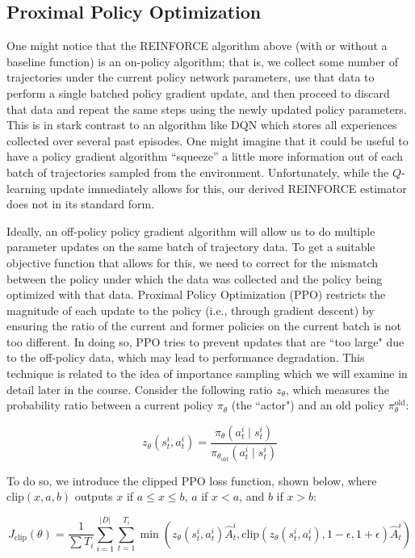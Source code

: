 \documentclass{article}
\begin{document}
\subsection{Proximal Policy Optimization}

One might notice that the REINFORCE algorithm above (with or without a baseline function) is an on-policy algorithm; that is, we collect some number of trajectories under the current policy network parameters, use that data to perform a single batched policy gradient update, and then proceed to discard that data and repeat the same steps using the newly updated policy parameters. This is in stark contrast to an algorithm like DQN which stores all experiences collected over several past episodes. One might imagine that it could be useful to have a policy gradient algorithm ``squeeze'' a little more information out of each batch of trajectories sampled from the environment. Unfortunately, while the $Q$-learning update immediately allows for this, our derived REINFORCE estimator does not in its standard form.

Ideally, an off-policy policy gradient algorithm will allow us to do multiple parameter updates on the same batch of trajectory data. To get a suitable objective function that allows for this, we need to correct for the mismatch between the policy under which the data was collected and the policy being optimized with that data. Proximal Policy Optimization (PPO) restricts the magnitude of each update to the policy (i.e., through gradient descent) by ensuring the ratio of the current and former policies on the current batch is not too different. In doing so, PPO tries to prevent updates that are ``too large" due to the off-policy data, which may lead to performance degradation. This technique is related to the idea of importance sampling which we will examine in detail later in the course. Consider the following ratio $z_\theta$, which measures the probability ratio between a current policy $\pi_\theta$ (the ``actor") and an old policy $\pi_\theta^\mathrm{old}$:

$$
z_\theta(s^i_t, a^i_t) = \frac{\pi_\theta(a^i_t \mid s^i_t)}{\pi_{\theta_\mathrm{old}}(a^i_t \mid s^i_t)}
$$

To do so, we introduce the clipped PPO loss function, shown below, where $\mathrm{clip}(x, a, b)$ outputs $x$ if $a \le x \le b$, $a$ if $x < a$, and $b$ if $x > b$:

$$
J_\mathrm{clip}(\theta) = \frac{1}{\sum T_i} \sum_{i=1}^{|D|} \sum_{t=1}^{T_i} \min (z_\theta(s^i_t, a^i_t)  \hat{A}^i_t, \mathrm{clip}(z_\theta(s^i_t, a^i_t)  , 1 - \epsilon, 1 + \epsilon )\hat{A}^i_t)
$$
\end{document}
